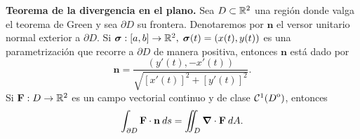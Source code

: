 \begin{theorem}
\textbf{Teorema de la divergencia en el plano.} Sea $D\subset\mathbb{R}^2$ una regi\'on donde valga el teorema de Green y sea $\partial D$ su frontera. Denotaremos por $\mathbf{n}$ el versor unitario normal exterior a $\partial D$.  Si $\boldsymbol{\sigma}:[a,b]\to\mathbb{R}^2,\;\boldsymbol{\sigma}(t)=(x(t),y(t))$ es una parametrizaci\'on que recorre a $\partial D$ de manera positiva,  entonces  $\mathbf{n}$ est\'a dado por 
\[
    \mathbf{n}=\frac{(y'(t),-x'(t))}{\sqrt{[x'(t)]^2+[y'(t)]^2}}.
\]
Si $\mathbf{F}:  D\to \mathbb{R}^2$ es un campo vectorial continuo y de clase $\mathcal{C}^1({\kern0ptD}^{\mathrm{o}})$,  entonces
\[
    \int_{\partial D}\mathbf{F}\cdot\mathbf{n}\:ds=\iint_D\grad\cdot\mathbf{F}\:dA.
\]
\end{theorem}